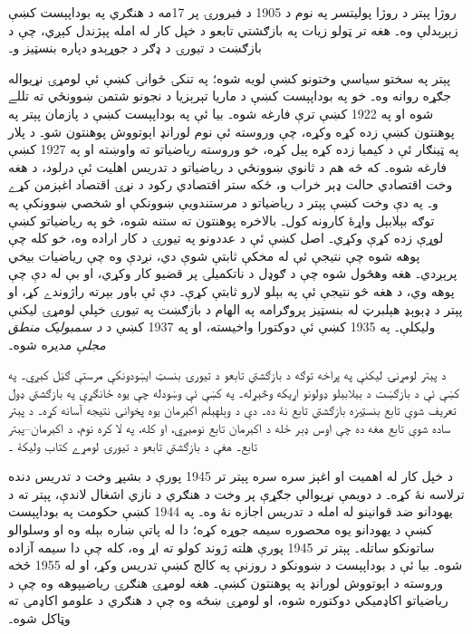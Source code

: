\documentclass[../../../include/open-logic-section]{subfiles}
\begin{document}



روژا پېتر د روژا پوليتسر په نوم د 1905 د
فبرورۍ پر 17مه د هنګري په بوداپېست کښې
زېږېدلې وه۔ هغه تر ټولو زيات په بازګشتي
تابعو د خپل کار له امله پېژندل کېږي،
چې د بازګښت د تيورۍ د ډګر د جوړېدو
دپاره بنسټيز و۔

پېتر په سختو سياسي وختونو کښې لويه شوه؛
په تنکۍ ځوانۍ کښې ئې لومړۍ نړيواله جګړه
روانه وه۔ خو په بوداپېست کښې د ماريا
تېرېزيا د نجونو شتمن ښوونځي ته تللے
شوه او په 1922 کښې ترې فارغه شوه۔ بيا
ئې په بوداپېست کښې د پازمان پېتر په
پوهنتون کښې زده کړه وکړه، چې وروسته
ئې نوم لورانډ اېوتووش پوهنتون شو۔ د
پلار په ټينګار ئې د کيميا زده کړه
پيل کړه، خو وروسته رياضياتو ته
واوښته او په 1927 کښې فارغه شوه۔
که څه هم د ثانوي ښوونځي د رياضياتو
د تدريس اهليت ئې درلود، د هغه وخت
اقتصادي حالت ډېر خراب و، ځکه ستر
اقتصادي رکود د نړۍ اقتصاد اغېزمن
کړے و۔ په دې وخت کښې پېتر د
رياضياتو د مرستندويې ښوونکې او
شخصي ښوونکې په توګه بېلابېل واړۀ
کارونه کول۔ بالاخره پوهنتون ته
ستنه شوه، څو په رياضياتو کښې لوړې
زده کړې وکړي۔ اصل کښې ئې د عددونو
په تيورۍ د کار اراده وه، خو کله
چې پوهه شوه چې نتيجې ئې له مخکې
ثابتې شوې دي، نږدې وه چې رياضيات
بيخي پرېږدي۔ هغه وهڅول شوه چې د
ګوډل د ناتکميلۍ پر قضيو کار وکړي،
او بې له دې چې پوهه وي، د هغه
څو نتيجې ئې په بېلو لارو ثابتې
کړې۔ دې ئې باور بېرته راژوندے
کړ، او پېتر د ډېوېډ هېلبرټ له
بنسټيز پروګرامه په الهام د بازګښت
په تيورۍ خپلې لومړۍ ليکنې وليکلې۔
په 1935 کښې ئې دوکتورا واخيسته،
او په 1937 کښې د \emph{د سمبوليک
منطق مجلې} مديره شوه۔

د پېتر لومړنۍ ليکنې په پراخه توګه د
بازګشتي تابعو د تيورۍ بنسټ ايښودونکې
مرستې ګڼل کېږي۔ په \cite{Peter1935a}
کښې ئې د بازګښت د بېلابېلو ډولونو
اړيکه وڅېړله۔ په \cite{Peter1935b}
کښې ئې وښودله چې يوه ځانګړې په
بازګشتي ډول تعريف شوې تابع بنسټيزه
بازګشتي تابع نۀ ده۔ دې د وېلهېلم
اکېرمان يوه پخوانۍ نتيجه آسانه
کړه۔ د پېتر ساده شوې تابع هغه
ده چې اوس ډېر ځله د اکېرمان
تابع نومېږي، او کله، په لا
کره نوم، د اکېرمان--پېتر تابع۔
هغې د بازګشتي تابعو د تيورۍ
لومړے کتاب وليکۀ \citep{Peter1951}۔

د خپل کار له اهميت او اغېز سره سره پېتر
تر 1945 پورې د بشپړ وخت د تدريس دنده
ترلاسه نۀ کړه۔ د دويمې نړيوالې جګړې
پر وخت د هنګري د نازي اشغال لاندې،
پېتر ته د يهودانو ضد قوانينو له
امله د تدريس اجازه نۀ وه۔ په 1944
کښې حکومت په بوداپېست کښې د
يهودانو يوه محصوره سيمه جوړه کړه؛
دا له پاتې ښاره بېله وه او وسلوالو
ساتونکو ساتله۔ پېتر تر 1945 پورې
هلته ژوند کولو ته اړ وه، کله چې
دا سيمه آزاده شوه۔ بيا ئې د
بوداپېست د ښوونکو د روزنې په
کالج کښې تدريس وکړ، او له 1955
څخه وروسته د اېوتووش لورانډ
په پوهنتون کښې۔ هغه لومړۍ
هنګرۍ رياضيپوهه وه چې د
رياضياتو اکاډميکي دوکتوره شوه،
او لومړۍ ښځه وه چې د هنګري
د علومو اکاډمۍ ته وټاکل شوه۔
\end{document}
